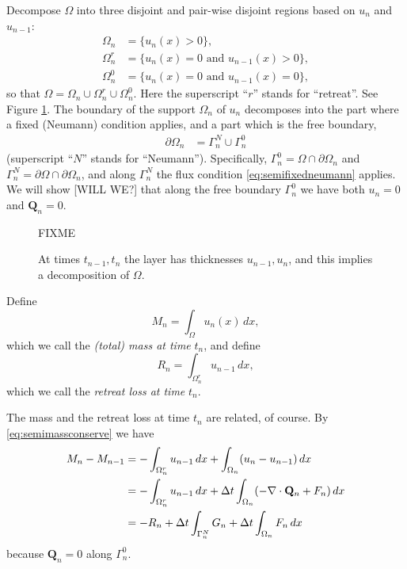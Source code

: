 \documentclass[final,leqno,onefignum,onetabnum]{siamltex1213bueler}
\newcommand\bQ{\mathbf{Q}}
\newcommand{\Div}{\nabla\cdot}
\begin{document}
Decompose $\Omega$ into three disjoint and pair-wise disjoint regions based on $u_n$ and $u_{n-1}$:
\begin{align*}
\Omega_n &= \{u_n(x)>0\}, \\
\Omega_n^r &= \{u_n(x)=0 \text{ and } u_{n-1}(x) > 0\}, \\
\Omega_n^0 &= \{u_n(x)=0 \text{ and } u_{n-1}(x) = 0\},
\end{align*}
so that $\Omega = \Omega_n \cup \Omega_n^r \cup \Omega_n^0$.  Here the superscript ``$r$'' stands for ``retreat''.  See Figure \ref{fig:domains}.  The boundary of the support $\Omega_n$ of $u_n$ decomposes into the part where a fixed (Neumann) condition applies, and a part which is the free boundary,
\begin{align*}
\partial\Omega_n &= \Gamma_n^N \cup \Gamma_n^0
\end{align*}
(superscript ``$N$'' stands for ``Neumann'').  Specifically, $\Gamma_n^0 = \Omega \cap \partial \Omega_n$ and $\Gamma_n^N = \partial \Omega \cap \partial \Omega_n$, and along $\Gamma_n^N$ the flux condition \eqref{eq:semifixedneumann} applies.  We will show [WILL WE?] that along the free boundary $\Gamma_n^0$ we have both $u_n=0$ and $\bQ_n = 0$.

\begin{figure}[ht]
\centerline{FIXME}
\caption{At times $t_{n-1},t_n$ the layer has thicknesses $u_{n-1},u_n$, and this implies a decomposition of $\Omega$.}
\label{fig:domains}
\end{figure}

Define
\begin{equation}
M_n = \int_\Omega u_n(x)\,dx,
\end{equation}
which we call the \emph{(total) mass at time} $t_n$, and define
\begin{equation}
R_n = \int_{\Omega_n^r} u_{n-1}\,dx,
\end{equation}
which we call the \emph{retreat loss at time} $t_n$.

The mass and the retreat loss at time $t_n$ are related, of course.  By \eqref{eq:semimassconserve} we have
\begin{align}
M_n - M_{n-1} &=  - \int_{\Omega_n^r} u_{n-1}\,dx + \int_{\Omega_n} (u_n - u_{n-1})\,dx \label{eq:massstep} \\
   &= - \int_{\Omega_n^r} u_{n-1}\,dx + \Delta t \int_{\Omega_n} (- \Div \bQ_n + F_n) \,dx \notag \\
   &= - R_n + \Delta t \int_{\Gamma_n^N} G_n + \Delta t \int_{\Omega_n} F_n\,dx \notag
\end{align}
because $\bQ_n=0$ along $\Gamma_n^0$.
\end{document}
